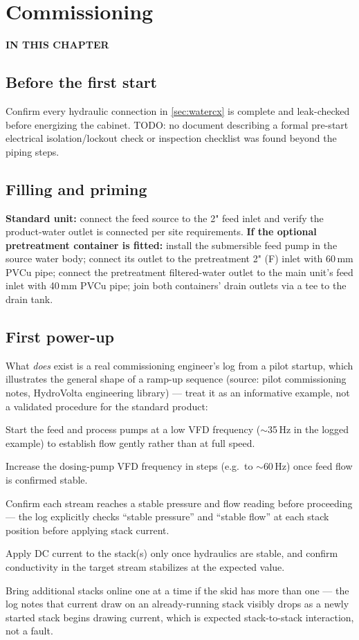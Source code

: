 \documentclass[a4paper,11pt,twoside,openright,numbers=noenddot]{scrreprt}
\newcommand{\chaptertoc}{%
  \begingroup
  \etocsetnexttocdepth{1}%
  \etocsettocstyle
    {{\sffamily\bfseries\footnotesize\color{hvmuted}IN THIS CHAPTER\par}%
     \vspace{5pt}{\color{hvink}\rule{\linewidth}{1.2pt}}\par\vspace{2pt}}{}%
  \etocsetstyle{section}{}{}
    {\par\vspace{4pt}\noindent
     \makebox[11mm][l]{\sffamily\bfseries\small\color{hvprimary}\etocnumber}%
     \sffamily\small\etocname\hfill{\color{hvmuted}\etocpage}%
     \par\vspace{4pt}{\color{hvrule}\rule{\linewidth}{0.4pt}}}{}%
  \localtableofcontents
  \endgroup}
\begin{document}
\chapter{Commissioning}
\label{ch:commissioning}
\chaptertoc

\section{Before the first start}
Confirm every hydraulic connection in \cref{sec:watercx} is complete and
leak-checked before energizing the cabinet. TODO: no document describing a
formal pre-start electrical isolation/lockout check or inspection
checklist was found beyond the piping steps.

\section{Filling and priming}
\textbf{Standard unit:} connect the feed source to the 2" feed inlet and
verify the product-water outlet is connected per site requirements.
\textbf{If the optional pretreatment container is fitted:} install the
submersible feed pump in the source water body; connect its outlet to the
pretreatment 2\textonehalf" (F) inlet with 60\,mm PVCu pipe; connect the
pretreatment filtered-water outlet to the main unit's feed inlet with
40\,mm PVCu pipe; join both containers' drain outlets via a tee to the
drain tank.

\section{First power-up}
What \emph{does} exist is a real
commissioning engineer's log from a pilot startup, which illustrates the
general shape of a ramp-up sequence (source: pilot commissioning notes,
HydroVolta engineering library) --- treat it as an informative example, not
a validated procedure for the standard product:
\begin{procedure}
\item Start the feed and process pumps at a low VFD frequency
  ($\sim$35\,Hz in the logged example) to establish flow gently rather
  than at full speed.
\item Increase the dosing-pump VFD frequency in steps (e.g.\ to
  $\sim$60\,Hz) once feed flow is confirmed stable.
\item Confirm each stream reaches a stable pressure and flow reading
  before proceeding --- the log explicitly checks \enquote{stable
  pressure} and \enquote{stable flow} at each stack position before
  applying stack current.
\item Apply DC current to the stack(s) only once hydraulics are stable,
  and confirm conductivity in the target stream stabilizes at the
  expected value.
\item Bring additional stacks online one at a time if the skid has more
  than one --- the log notes that current draw on an already-running
  stack visibly drops as a newly started stack begins drawing current,
  which is expected stack-to-stack interaction, not a fault.
\end{procedure}
\end{document}
